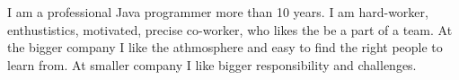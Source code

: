 \documentclass[9pt]{developercv} %
\begin{document}
\vspace{0.5cm}



\begin{minipage}[t]{0.4\textwidth} %
	\vspace{-\baselineskip} %
	
	I am a professional Java programmer more than 10 years. I am hard-worker, enthustistics, motivated, precise co-worker, who likes the be a part of a team. At the bigger company I like the athmosphere and easy to find the right people to learn from. At smaller company I like bigger responsibility and challenges.

\end{minipage}
\hfill %
\begin{minipage}[t]{0.5\textwidth} %
	\vspace{-\baselineskip} %
	\begin{barchart}{5.5}
	\end{barchart}
\end{minipage}

\begin{center}
\end{center}


\end{document}
